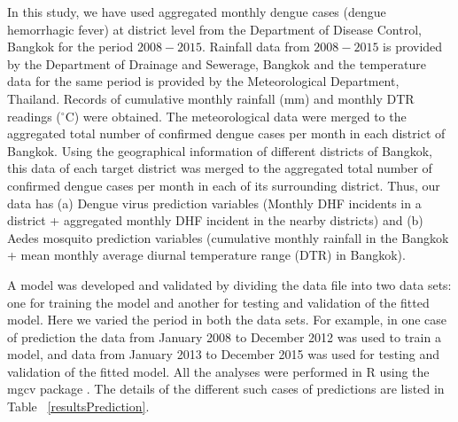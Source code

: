 \documentclass{bmcart}
\begin{document}
In this study, we have used aggregated monthly dengue cases (dengue hemorrhagic fever) at district level from the Department of Disease Control, Bangkok for the period $2008-2015$.  Rainfall data from $2008-2015$ is provided by the Department of Drainage and Sewerage, Bangkok and the temperature data for the same period is provided by the Meteorological Department, Thailand. Records of cumulative monthly rainfall (mm) and monthly DTR readings ($^{\circ}$C) were obtained. The meteorological data were merged to the aggregated total number of confirmed dengue cases per month in each district of Bangkok. Using the geographical information of different districts of Bangkok, this data of each target district was merged to the  aggregated total number of confirmed dengue cases per month in each of its surrounding district. Thus, our data has (a) Dengue virus prediction variables (Monthly DHF incidents in a district + aggregated monthly DHF incident in the nearby districts) and (b) Aedes mosquito prediction variables (cumulative monthly rainfall in the Bangkok + mean monthly average diurnal temperature range (DTR) in Bangkok). 


A model was developed and validated by dividing the data file into two data sets: one for training the model and another for testing and validation of the fitted model. Here we varied the period in both the data sets. For example, in one case of prediction the data from January 2008 to December 2012 was used to train a model, and data from January 2013 to December 2015 was used for testing and validation of the fitted model. All the analyses were performed in R \cite{Rsoftware} using the mgcv package \cite{mgcv}.  The details of the different such cases of predictions are listed in Table ~\ref{resultsPrediction}.  







\end{document}
